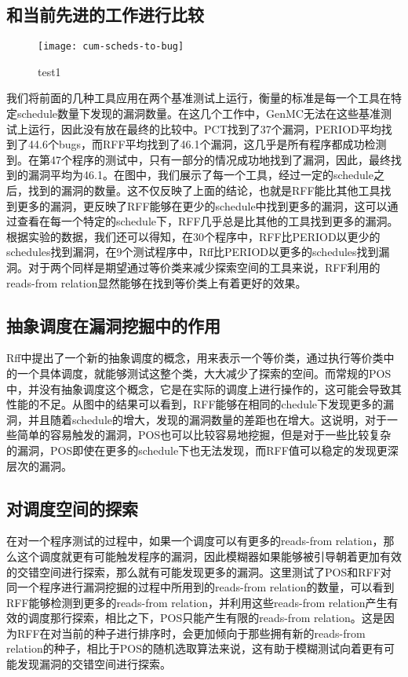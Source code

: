 \subsection{和当前先进的工作进行比较}

\begin{figure}[ht]
    \centering
    \texttt{[image: cum-scheds-to-bug]}
    \caption{\label{fig:test1}test1}
\end{figure}

我们将前面的几种工具应用在两个基准测试上运行，衡量的标准是每一个工具在特定schedule数量下发现的漏洞数量。在这几个工作中，GenMC无法在这些基准测试上运行，因此没有放在最终的比较中。PCT找到了37个漏洞，PERIOD平均找到了44.6个bugs，而RFF平均找到了46.1个漏洞，这几乎是所有程序都成功检测到。在第47个程序的测试中，只有一部分的情况成功地找到了漏洞，因此，最终找到的漏洞平均为46.1。在图中，我们展示了每一个工具，经过一定的schedule之后，找到的漏洞的数量。这不仅反映了上面的结论，也就是RFF能比其他工具找到更多的漏洞，更反映了RFF能够在更少的schedule中找到更多的漏洞，这可以通过查看在每一个特定的schedule下，RFF几乎总是比其他的工具找到更多的漏洞。根据实验的数据，我们还可以得知，在30个程序中，RFF比PERIOD以更少的schedules找到漏洞，在9个测试程序中，Rff比PERIOD以更多的schedules找到漏洞。对于两个同样是期望通过等价类来减少探索空间的工具来说，RFF利用的reads-from relation显然能够在找到等价类上有着更好的效果。

\subsection{抽象调度在漏洞挖掘中的作用}

Rff中提出了一个新的抽象调度的概念，用来表示一个等价类，通过执行等价类中的一个具体调度，就能够测试这整个类，大大减少了探索的空间。而常规的POS中，并没有抽象调度这个概念，它是在实际的调度上进行操作的，这可能会导致其性能的不足。从图中的结果可以看到，RFF能够在相同的chedule下发现更多的漏洞，并且随着schedule的增大，发现的漏洞数量的差距也在增大。这说明，对于一些简单的容易触发的漏洞，POS也可以比较容易地挖掘，但是对于一些比较复杂的漏洞，POS即使在更多的schedule下也无法发现，而RFF值可以稳定的发现更深层次的漏洞。

\subsection{对调度空间的探索}

在对一个程序测试的过程中，如果一个调度可以有更多的reads-from relation，那么这个调度就更有可能触发程序的漏洞，因此模糊器如果能够被引导朝着更加有效的交错空间进行探索，那么就有可能发现更多的漏洞。这里测试了POS和RFF对同一个程序进行漏洞挖掘的过程中所用到的reads-from relation的数量，可以看到RFF能够检测到更多的reads-from relation，并利用这些reads-from relation产生有效的调度那行探索，相比之下，POS只能产生有限的reads-from relation。这是因为RFF在对当前的种子进行排序时，会更加倾向于那些拥有新的reads-from relation的种子，相比于POS的随机选取算法来说，这有助于模糊测试向着更有可能发现漏洞的交错空间进行探索。

